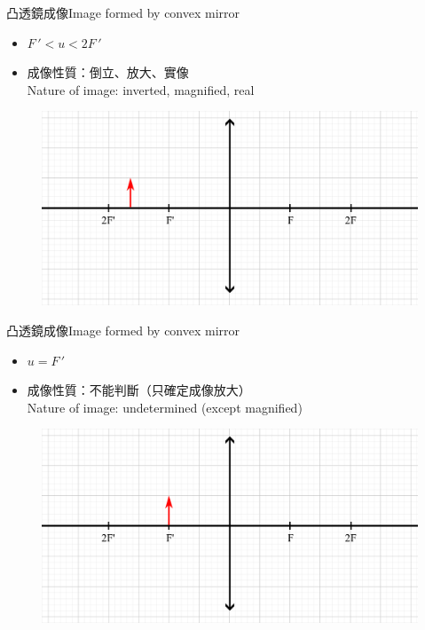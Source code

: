 \documentclass[beamer=true]{standalone}
\begin{document}
\begin{frame}{凸透鏡成像Image formed by convex mirror}
    \begin{itemize}
        \item $F\,'<u<2F\,'$
        \item 成像性質：倒立、放大、實像
              \\Nature of image: inverted, magnified, real
    \end{itemize}
    \begin{figure}
        \centering
        \includegraphics[width=1\linewidth]{assets/d9qi09mqwdqw.png}


    \end{figure}
\end{frame}


\begin{frame}{凸透鏡成像Image formed by convex mirror}
    \begin{itemize}
        \item $u=F\,'$
        \item 成像性質：不能判斷（只確定成像放大）
              \\Nature of image: undetermined (except magnified)
    \end{itemize}
    \begin{figure}
        \centering
        \includegraphics[width=1\linewidth]{assets/dqi0wqn9dqwd9age.png}


    \end{figure}
\end{frame}
\end{document}
